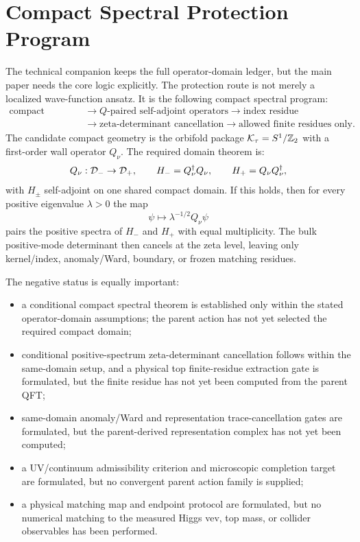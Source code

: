 \documentclass[11pt]{article}
\begin{document}
\section{Compact Spectral Protection Program}
The technical companion keeps the full operator-domain ledger, but the main
paper needs the core logic explicitly.  The protection route is not merely a
localized wave-function ansatz.  It is the following compact spectral program:
\begin{equation}
\begin{aligned}
\text{compact domain}
&\rightarrow
Q\text{-paired self-adjoint operators}
\rightarrow
\text{index residue} \\
&\rightarrow
\text{zeta-determinant cancellation}
\rightarrow
\text{allowed finite residues only} .
\end{aligned}
\end{equation}
The candidate compact geometry is the orbifold package
${\cal K}_\tau=S^1/\mathbb Z_2$ with a first-order wall operator $Q_\nu$.
The required domain theorem is:
\begin{equation}
Q_\nu:{\cal D}_-\to{\cal D}_+,\qquad
H_-=Q_\nu^\dagger Q_\nu,\qquad H_+=Q_\nu Q_\nu^\dagger ,
\end{equation}
with $H_\pm$ self-adjoint on one shared compact domain.  If this holds, then
for every positive eigenvalue $\lambda>0$ the map
\begin{equation}
\psi\mapsto \lambda^{-1/2}Q_\nu\psi
\end{equation}
pairs the positive spectra of $H_-$ and $H_+$ with equal multiplicity.  The
bulk positive-mode determinant then cancels at the zeta level, leaving only
kernel/index, anomaly/Ward, boundary, or frozen matching residues.

The negative status is equally important:
\begin{itemize}
\item a conditional compact spectral theorem is established only within the
stated operator-domain assumptions; the parent action has not yet selected the
required compact domain;
\item conditional positive-spectrum zeta-determinant cancellation follows
within the same-domain setup, and a physical top finite-residue extraction gate
is formulated, but the finite residue has not yet been computed from the parent
QFT;
\item same-domain anomaly/Ward and representation trace-cancellation gates are
formulated, but the parent-derived representation complex has not yet been
computed;
\item a UV/continuum admissibility criterion and microscopic completion target
are formulated, but no convergent parent action family is supplied;
\item a physical matching map and endpoint protocol are formulated, but no
numerical matching to the measured Higgs vev, top mass, or collider observables
has been performed.
\end{itemize}
\end{document}
